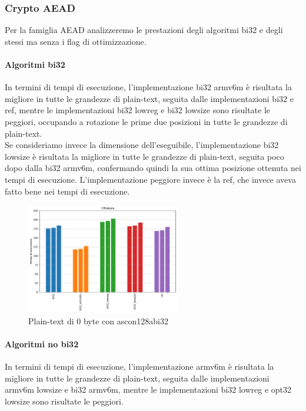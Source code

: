 \documentclass[12pt,a4paper,italian]{report}
\begin{document}
\subsubsection{Crypto AEAD}

Per la famiglia AEAD analizzeremo le prestazioni degli algoritmi bi32 e degli stessi ma senza i flag di ottimizzazione.

\paragraph{Algoritmi bi32}

In termini di tempi di esecuzione, l'implementazione bi32 armv6m è risultata la migliore in tutte le grandezze di plain-text, seguita dalle implementazioni bi32 e ref, mentre le implementazioni bi32 lowreg e bi32 lowsize sono risultate le peggiori, occupando a rotazione le prime due posizioni in tutte le grandezze di plain-text. \\

\noindent Se consideriamo invece la dimensione dell'eseguibile, l'implementazione bi32 lowsize è risultata la migliore in tutte le grandezze di plain-text, seguita poco dopo dalla bi32 armv6m, confermando quindi la sua ottima posizione ottenuta nei tempi di esecuzione. L'implementazione peggiore invece è la ref, che invece aveva fatto bene nei tempi di esecuzione.

\begin{figure}[H]
    \centering
    \includegraphics[width=0.6\textwidth]{adafruit/ascon128abi32.pdf}
    \caption{Plain-text di 0 byte con ascon128abi32}
\end{figure}

\paragraph{Algoritmi no bi32}

In termini di tempi di esecuzione, l'implementazione armv6m è risultata la migliore in tutte le grandezze di plain-text, seguita dalle implementazioni armv6m lowsize e bi32 armv6m, mentre le implementazioni bi32 lowreg e opt32 lowsize sono risultate le peggiori. \\
\end{document}
